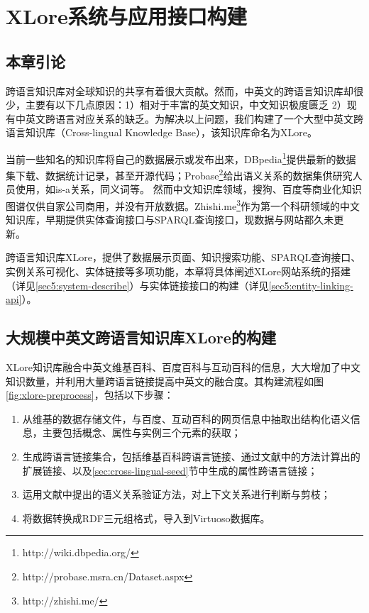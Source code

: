 \chapter{XLore系统与应用接口构建}
\label{cha:xlore}

\section{本章引论}

跨语言知识库对全球知识的共享有着很大贡献。然而，中英文的跨语言知识库却很少，主要有以下几点原因：1）相对于丰富的英文知识，中文知识极度匮乏 2）现有中英文跨语言对应关系的缺乏。为解决以上问题，我们构建了一个大型中英文跨语言知识库（Cross-lingual Knowledge Base），该知识库命名为{\heiti XLore}。

当前一些知名的知识库将自己的数据展示或发布出来，DBpedia\footnote{http://wiki.dbpedia.org/}提供最新的数据集下载、数据统计记录，甚至开源代码；Probase\footnote{http://probase.msra.cn/Dataset.aspx}给出语义关系的数据集供研究人员使用，如is-a关系，同义词等。
然而中文知识库领域，搜狗、百度等商业化知识图谱仅供自家公司商用，并没有开放数据。Zhishi.me\footnote{http://zhishi.me/}作为第一个科研领域的中文知识库，早期提供实体查询接口与SPARQL查询接口，现数据与网站都久未更新。

跨语言知识库XLore，提供了数据展示页面、知识搜索功能、SPARQL查询接口、实例关系可视化、实体链接等多项功能，本章将具体阐述XLore网站系统的搭建（详见\ref{sec5:system-describe}）与实体链接接口的构建（详见\ref{sec5:entity-linking-api}）。

\section{大规模中英文跨语言知识库XLore的构建}
\label{sec5:cross-lingual-knowledge-base}

XLore知识库融合中英文维基百科、百度百科与互动百科的信息，大大增加了中文知识数量，并利用大量跨语言链接提高中英文的融合度。其构建流程如图\ref{fig:xlore-preprocess}，包括以下步骤：
\begin{enumerate}
\item 从维基的数据存储文件，与百度、互动百科的网页信息中抽取出结构化语义信息，主要包括概念、属性与实例三个元素的获取；
\item 生成跨语言链接集合，包括维基百科跨语言链接、通过文献\cite{wang2012cross}中的方法计算出的扩展链接、以及\ref{sec:cross-lingual-seed}节中生成的属性跨语言链接；
\item 运用文献\cite{wang2014cross}中提出的语义关系验证方法，对上下文关系进行判断与剪枝；
\item 将数据转换成RDF三元组格式，导入到Virtuoso数据库。
\end{enumerate}

